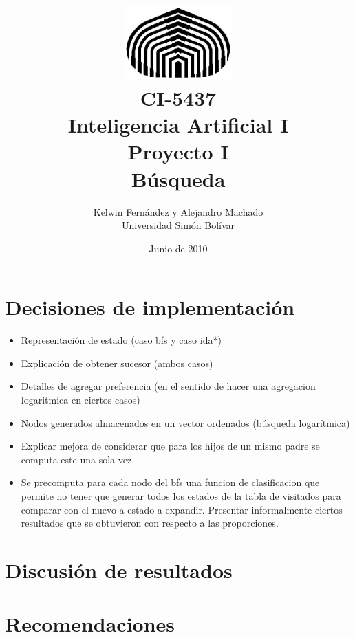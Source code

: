 \documentclass[letterpaper,12pt, titlepage]{article}
\begin{document}
\title{	\includegraphics[height=80pt]{usb.jpg} \\
CI-5437 \\ Inteligencia Artificial I \\
Proyecto I\\
Búsqueda}
\author{Kelwin Fernández y Alejandro Machado\\
	Universidad Simón Bolívar} 
\date{Junio de 2010} 
\maketitle

\section{Decisiones de implementación}
\begin{itemize}
\item Representación de estado (caso bfs y caso ida*)

\item Explicación de obtener sucesor (ambos casos)

\item Detalles de agregar preferencia (en el sentido
de hacer una agregacion logaritmica en ciertos casos)
\item Nodos generados almacenados en un vector ordenados
(búsqueda logarítmica)

\item Explicar mejora de considerar que para los hijos
de un mismo padre se computa este una sola vez.

\item Se precomputa para cada nodo del bfs una funcion de
clasificacion que permite no tener que generar todos los
estados de la tabla de visitados para comparar con el
nuevo a estado a expandir. Presentar informalmente
ciertos resultados que se obtuvieron con respecto a las
proporciones.

\end{itemize}

\section{Discusión de resultados}

\section{Recomendaciones}
\end{document}
